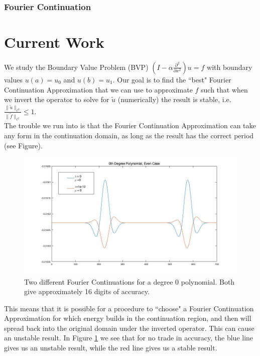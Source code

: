 \documentclass[11pt]{amsart}
\begin{document}
\subsubsection{Fourier Continuation}

\section{Current Work}
We study the Boundary Value Problem (BVP) $(I-\alpha \frac{\partial^2}{\partial x^2})u=f$ with boundary values $u(a)=u_0$ and $u(b)=u_1$.  Our goal is to find the ``best" Fourier Continuation Approximation that we can use to approximate $f$ such that when we invert the operator to solve for $\tilde{u}$ (numerically) the result is stable, i.e. $\frac{\|\tilde{u}\|_{\ell^2}}{\|\tilde{f}\|_{\ell^2}} \leq 1$.  \\
The trouble we run into is that the Fourier Continuation Approximation can take any form in the continuation domain, as long as the result has the correct period (see Figure). 
\begin{figure}
\begin{center}
\includegraphics[scale = .4]{VariousConts0degEven.jpg}
\caption{Two different Fourier Continuations for a degree 0 polynomial. Both give approximately 16 digits of accuracy.}
\label{fig:Fig1}
\end{center}
\end{figure}
This means that it is possible for a procedure to ``choose" a Fourier Continuation Approximation for which energy builds in the continuation region, and then will spread back into the original domain under the inverted operator.  This can cause an unstable result.  In Figure \ref{fig:Fig1} we see that for no trade in accuracy, the blue line gives us an unstable result, while the red line gives us a stable result. \\
\end{document}
